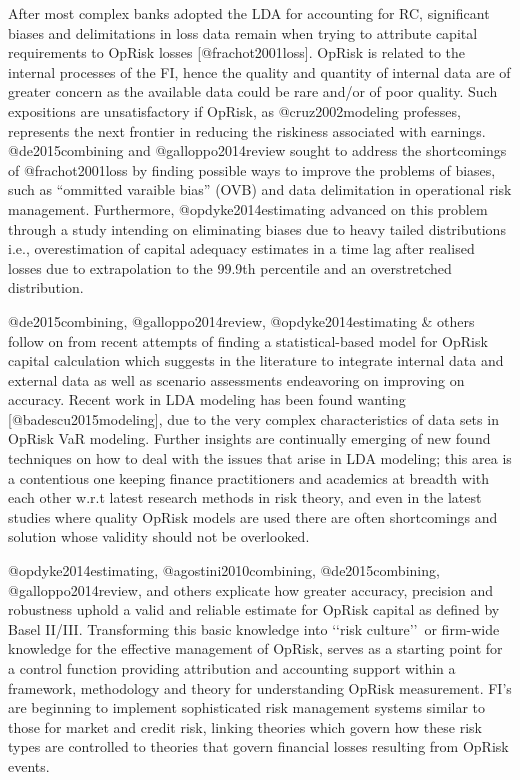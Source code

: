 \documentclass[]{article}
\begin{document}
After most complex banks adopted the LDA for accounting for RC,
significant biases and delimitations in loss data remain when trying to
attribute capital requirements to OpRisk losses {[}@frachot2001loss{]}.
OpRisk is related to the internal processes of the FI, hence the quality
and quantity of internal data are of greater concern as the available
data could be rare and/or of poor quality. Such expositions are
unsatisfactory if OpRisk, as @cruz2002modeling professes, represents the
next frontier in reducing the riskiness associated with earnings.
@de2015combining and @galloppo2014review sought to address the
shortcomings of @frachot2001loss by finding possible ways to improve the
problems of biases, such as ``ommitted varaible bias'' (OVB) and data
delimitation in operational risk management. Furthermore,
@opdyke2014estimating advanced on this problem through a study intending
on eliminating biases due to heavy tailed distributions i.e.,
overestimation of capital adequacy estimates in a time lag after
realised losses due to extrapolation to the 99.9th percentile and an
overstretched distribution.\medskip

@de2015combining, @galloppo2014review, @opdyke2014estimating \& others
follow on from recent attempts of finding a statistical-based model for
OpRisk capital calculation which suggests in the literature to integrate
internal data and external data as well as scenario assessments
endeavoring on improving on accuracy. Recent work in LDA modeling has
been found wanting {[}@badescu2015modeling{]}, due to the very complex
characteristics of data sets in OpRisk VaR modeling. Further insights
are continually emerging of new found techniques on how to deal with the
issues that arise in LDA modeling; this area is a contentious one
keeping finance practitioners and academics at breadth with each other
w.r.t latest research methods in risk theory, and even in the latest
studies where quality OpRisk models are used there are often
shortcomings and solution whose validity should not be overlooked.
\medskip

@opdyke2014estimating, @agostini2010combining, @de2015combining,
@galloppo2014review, and others explicate how greater accuracy,
precision and robustness uphold a valid and reliable estimate for OpRisk
capital as defined by Basel II/III. Transforming this basic knowledge
into \lq\lq risk culture\rq\rq~or firm-wide knowledge for the effective
management of OpRisk, serves as a starting point for a control function
providing attribution and accounting support within a framework,
methodology and theory for understanding OpRisk measurement. FI's are
beginning to implement sophisticated risk management systems similar to
those for market and credit risk, linking theories which govern how
these risk types are controlled to theories that govern financial losses
resulting from OpRisk events. \medskip
\end{document}
